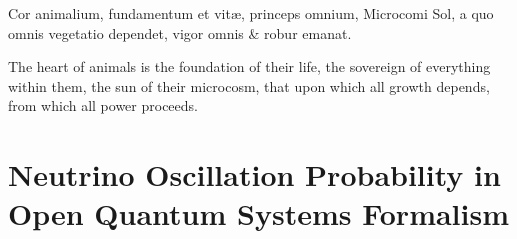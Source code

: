 \begin{savequote}[8cm]
\textlatin{Cor animalium, fundamentum e\longs t vitæ, princeps omnium, Microco\longs mi Sol, a quo omnis vegetatio dependet, vigor omnis \& robur emanat.}

The heart of animals is the foundation of their life, the sovereign of everything within them, the sun of their microcosm, that upon which all growth depends, from which all power proceeds.
\end{savequote}

\chapter{\label{app:1-qd_recipe}Neutrino Oscillation Probability in Open Quantum Systems Formalism}

\minitoc

